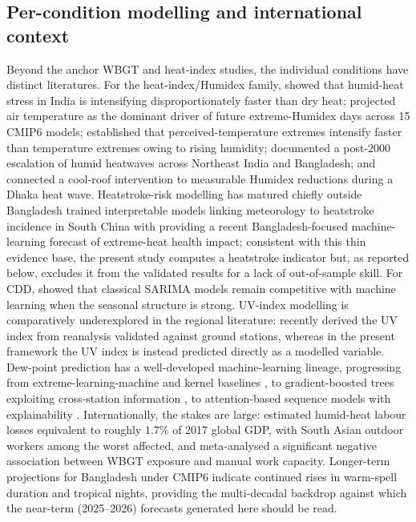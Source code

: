 \documentclass[review,11pt]{elsarticle}
\begin{document}
\subsection{Per-condition modelling and international context}
Beyond the anchor WBGT and heat-index studies, the individual conditions have
distinct literatures. For the heat-index/Humidex family, \citet{sojan2024humidheat}
showed that humid-heat stress in India is intensifying disproportionately faster
than dry heat; \citet{kushwaha2026humidex} projected air temperature as the
dominant driver of future extreme-Humidex days across 15 CMIP6 models;
\citet{scoccimarro2017humidity} established that perceived-temperature extremes
intensify faster than temperature extremes owing to rising humidity;
\citet{saha2025postescalation} documented a post-2000 escalation of humid heatwaves
across Northeast India and Bangladesh; and \citet{tabassum2025coolroofs} connected
a cool-roof intervention to measurable Humidex reductions during a Dhaka heat wave.
Heatstroke-risk modelling has matured chiefly outside Bangladesh %
\citet{xuh2024heatstroke} trained interpretable models linking meteorology to
heatstroke incidence in South China with \citet{ehsan2026extremeheat} providing a
recent Bangladesh-focused machine-learning forecast of extreme-heat health impact;
consistent with this thin evidence base, the present study computes a heatstroke
indicator but, as reported below, excludes it from the validated results for a lack
of out-of-sample skill. For CDD, \citet{bilgili2023cdd} showed that classical
SARIMA models remain competitive with machine learning when the seasonal structure
is strong. UV-index modelling is comparatively underexplored in the regional
literature: \citet{teggi2026uvindex} recently derived the UV index from reanalysis
validated against ground stations, whereas in the present framework the UV index is
instead predicted directly as a modelled variable. Dew-point prediction has a
well-developed machine-learning lineage, progressing from extreme-learning-machine
and kernel baselines \citep{mohammadi2015elm,qasem2019dewpoint}, to gradient-boosted
trees exploiting cross-station information \citep{yao2022catboost}, to
attention-based sequence models with explainability \citep{abdullah2025xai}.
Internationally, the stakes are large: \citet{parsons2021labor} estimated humid-heat
labour losses equivalent to roughly $1.7\%$ of 2017 global GDP, with South Asian
outdoor workers among the worst affected, and \citet{flouris2022} meta-analysed a
significant negative association between WBGT exposure and manual work capacity.
Longer-term projections for Bangladesh under CMIP6 \citep{khatun2024} indicate
continued rises in warm-spell duration and tropical nights, providing the
multi-decadal backdrop against which the near-term (2025--2026) forecasts generated
here should be read.
\end{document}
